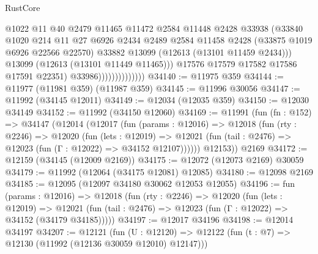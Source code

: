 \begin{lexlean}{RustCore}
\begin{coremodule}
                                    @1022
                                    @11
                                    @40
                                    @2479
                                    @11465
                                    @11472
                                    @2584
                                    @11448
                                    @2428
                                    @33938
                                    (@33840
                                      @1020
                                      @214
                                      @11
                                      @27
                                      @6926
                                      @2434
                                      @2489
                                      @2584
                                      @11458
                                      @2428
                                      (@33875 @1019 @6926 @22566 @22570)
                                      @33882
                                      @13099
                                      (@12613 (@13101 @11459 @2434)))
                                    @13099
                                    (@12613 (@13101 @11449 @11465)))
                                  @17576
                                  @17579
                                  @17582
                                  @17586
                                  @17591
                                  @22351)
                                @33986))))))))))))))
@34140 := @11975 @359
@34144 := @11977 (@11981 @359) (@11987 @359)
@34145 := @11996 @30056
@34147 := @11992 (@34145 @12011)
@34149 := @12034 (@12035 @359)
@34150 := @12030 @34149
@34152 := @11992 (@34150 @12060)
@34169 := @11991
    (fun (fn : @152) =>
    @34147
      (@12014
        (@12017
          (fun (params : @12016) =>
          @12018
            (fun (rty : @2246) =>
            @12020
              (fun (lets : @12019) =>
              @12021 (fun (tail : @2476) => @12023 (fun (Γ : @12022) => @34152 @12107))))))
        @12153))
    @2169
@34172 := @12159 (@34145 (@12009 @2169))
@34175 := @12072 (@12073 @2169) @30059
@34179 := @11992 (@12064 (@34175 @12081) @12085)
@34180 := @12098 @2169
@34185 := @12095 (@12097 @34180 @30062 @12053 @12055)
@34196 := fun (params : @12016) =>
  @12018
    (fun (rty : @2246) =>
    @12020
      (fun (lets : @12019) =>
      @12021 (fun (tail : @2476) => @12023 (fun (Γ : @12022) => @34152 (@34179 @34185)))))
@34197 := @12017 @34196
@34198 := @12014 @34197
@34207 := @12121
    (fun (U : @12120) => @12122 (fun (t : @7) => @12130 (@11992 (@12136 @30059 @12010) @12147)))

\end{coremodule}
\end{lexlean}
